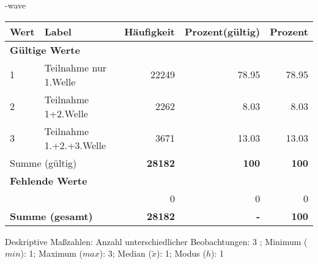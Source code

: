                 \vspace*{-\baselineskip}
					\begin{filecontents}{\jobname-wave}
					\begin{longtable}{lXrrr}
					\toprule
					\textbf{Wert} & \textbf{Label} & \textbf{Häufigkeit} & \textbf{Prozent(gültig)} & \textbf{Prozent} \\
					\endhead
					\midrule
					\multicolumn{5}{l}{\textbf{Gültige Werte}}\\

					1 &
					\multicolumn{1}{X}{ Teilnahme nur 1.Welle   } &


					  \num{22249} &
					  \num[round-mode=places,round-precision=2]{78.95} &
					    \num[round-mode=places,round-precision=2]{78.95} \\

					2 &
					\multicolumn{1}{X}{ Teilnahme 1+2.Welle   } &


					  \num{2262} &
					  \num[round-mode=places,round-precision=2]{8.03} &
					    \num[round-mode=places,round-precision=2]{8.03} \\

					3 &
					\multicolumn{1}{X}{ Teilnahme 1.+2.+3.Welle   } &


					  \num{3671} &
					  \num[round-mode=places,round-precision=2]{13.03} &
					    \num[round-mode=places,round-precision=2]{13.03} \\
					\midrule
					\multicolumn{2}{l}{Summe (gültig)} &
					  \textbf{\num{28182}} &
					\textbf{\num{100}} &
					  \textbf{\num[round-mode=places,round-precision=2]{100}} \\
					\multicolumn{5}{l}{\textbf{Fehlende Werte}}\\
						& & 0 & 0 & 0 \\
					\midrule
					\multicolumn{2}{l}{\textbf{Summe (gesamt)}} &
				      \textbf{\num{28182}} &
				    \textbf{-} &
				    \textbf{\num{100}} \\
					\bottomrule
					\end{longtable}
					\end{filecontents}
				\label{tableValues:wave}
				\vspace*{-\baselineskip}
                    \begin{noten}
                	    \note{} Deskriptive Maßzahlen:
                	    Anzahl unterschiedlicher Beobachtungen: 3%
                	    ; 
                	      Minimum ($min$): 1; 
                	      Maximum ($max$): 3; 
                	      Median ($\tilde{x}$): 1; 
                	      Modus ($h$): 1
                     \end{noten}

